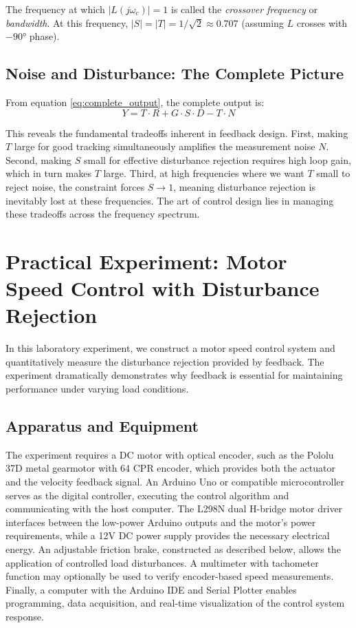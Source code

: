 The frequency at which $|L(j\omega_c)| = 1$ is called the \textit{crossover frequency} or \textit{bandwidth}. At this frequency, $|S| = |T| = 1/\sqrt{2} \approx 0.707$ (assuming $L$ crosses with $-90°$ phase).

\subsection{Noise and Disturbance: The Complete Picture}

From equation \eqref{eq:complete_output}, the complete output is:
\begin{equation}
Y = T \cdot R + G \cdot S \cdot D - T \cdot N
\end{equation}

This reveals the fundamental tradeoffs inherent in feedback design. First, making $T$ large for good tracking simultaneously amplifies the measurement noise $N$. Second, making $S$ small for effective disturbance rejection requires high loop gain, which in turn makes $T$ large. Third, at high frequencies where we want $T$ small to reject noise, the constraint forces $S \to 1$, meaning disturbance rejection is inevitably lost at these frequencies. The art of control design lies in managing these tradeoffs across the frequency spectrum.

\section{Practical Experiment: Motor Speed Control with Disturbance Rejection}
\label{sec:practical_experiment}

In this laboratory experiment, we construct a motor speed control system and quantitatively measure the disturbance rejection provided by feedback. The experiment dramatically demonstrates why feedback is essential for maintaining performance under varying load conditions.

\subsection{Apparatus and Equipment}

The experiment requires a DC motor with optical encoder, such as the Pololu 37D metal gearmotor with 64 CPR encoder, which provides both the actuator and the velocity feedback signal. An Arduino Uno or compatible microcontroller serves as the digital controller, executing the control algorithm and communicating with the host computer. The L298N dual H-bridge motor driver interfaces between the low-power Arduino outputs and the motor's power requirements, while a 12V DC power supply provides the necessary electrical energy. An adjustable friction brake, constructed as described below, allows the application of controlled load disturbances. A multimeter with tachometer function may optionally be used to verify encoder-based speed measurements. Finally, a computer with the Arduino IDE and Serial Plotter enables programming, data acquisition, and real-time visualization of the control system response.

